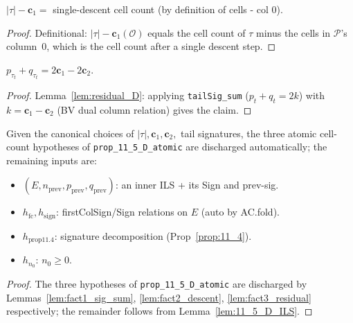 \begin{lemma}
  \label{lem:fact2_descent}
  \leanok

  $|\tau| - \mathbf{c}_1 = $ single-descent cell count (by definition of cells - col 0).
\end{lemma}
\begin{proof}
  \leanok
  Definitional: $|\tau| - \mathbf{c}_1(\mathcal{O})$ equals the cell count of $\tau$ minus the cells in $\mathcal{P}$'s column~0, which is the cell count after a single descent step.
\end{proof}


\begin{lemma}
  \label{lem:fact3_residual}
  \leanok
  $p_{\tau_t} + q_{\tau_t} = 2 \mathbf{c}_1 - 2 \mathbf{c}_2$.
\end{lemma}
\begin{proof}
  \leanok
  Lemma~\ref{lem:residual_D}: applying \texttt{tailSig\_sum} ($p_t + q_t = 2k$) with $k = \mathbf{c}_1 - \mathbf{c}_2$ (BV dual column relation) gives the claim.
\end{proof}


\begin{theorem}
  \label{thm:11_5_atomic_pbp}
  \leanok
  Given the canonical choices of $|\tau|, \mathbf{c}_1, \mathbf{c}_2,$ tail signatures,
  the three atomic cell-count hypotheses of \texttt{prop\_11\_5\_D\_atomic} are
  discharged automatically; the remaining inputs are:
  \begin{itemize}
    \item $(E, n_{\mathrm{prev}}, p_{\mathrm{prev}}, q_{\mathrm{prev}})$: an inner ILS + its Sign and prev-sig.
    \item $h_{\mathrm{fc}}, h_{\mathrm{sign}}$: firstColSign/Sign relations on $E$ (auto by AC.fold).
    \item $h_{\mathrm{prop11.4}}$: signature decomposition (Prop~\ref{prop:11_4}).
    \item $h_{n_0}$: $n_0 \geq 0$.
  \end{itemize}
\end{theorem}
\begin{proof}
  \leanok
  The three hypotheses of \texttt{prop\_11\_5\_D\_atomic} are discharged by Lemmas~\ref{lem:fact1_sig_sum}, \ref{lem:fact2_descent}, \ref{lem:fact3_residual} respectively; the remainder follows from Lemma~\ref{lem:11_5_D_ILS}.
\end{proof}


